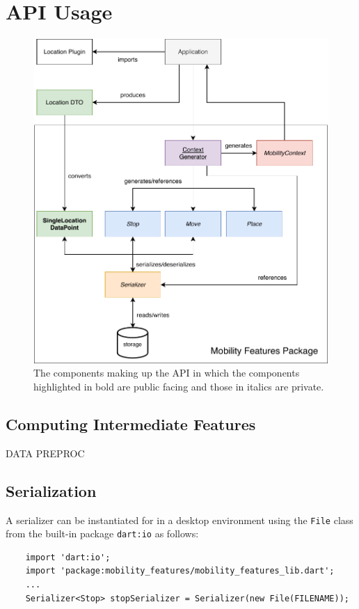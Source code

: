 \section{API Usage}
\begin{figure}
    \centering
    \includegraphics[width=\textwidth]{images/diagrams/api-diagram.pdf}
    \caption{The components making up the API in which the components highlighted in bold are public facing and those in italics are private.}
    \label{fig:api-diagram}
\end{figure}

\subsection{Computing Intermediate Features}
DATA PREPROC

\subsection{Serialization}
A serializer can be instantiated for in a desktop environment using the \verb|File| class from the built-in package \verb|dart:io| as follows:
\begin{verbatim}
    import 'dart:io';
    import 'package:mobility_features/mobility_features_lib.dart';
    ...
    Serializer<Stop> stopSerializer = Serializer(new File(FILENAME));
\end{verbatim}


